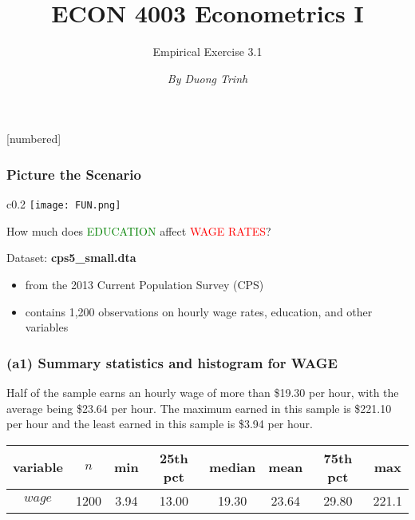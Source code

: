 \documentclass[11pt, xcolor=x11names,compress]{beamer}
\title [ECON 4003: Empirical Exercise 3.1]{ECON 4003 Econometrics I}
\author[]{Empirical Exercise 3.1}
\date[]{\textit{By Duong Trinh}}
\begin{document}
[numbered]
{
\frame{\titlepage}}


\begin{frame}[fragile,t]
\linespread{1.3}
\frametitle{Picture the Scenario}
        \begin{wrapfigure}{c}{0.2\textwidth}
            \texttt{[image: FUN.png]}
        \end{wrapfigure}
        How much does \textcolor{green}{EDUCATION} affect \textcolor{red}{WAGE RATES}?\\
\vspace{20mm}

Dataset: \textbf{cps5\_small.dta} 
\begin{itemize}
    \item from the 2013 Current Population Survey (CPS) %
    \item contains 1,200 observations on hourly wage rates, education, and other variables
\end{itemize}
\end{frame}

\begin{frame}[fragile,t]
\frametitle{(a1) Summary statistics and histogram for WAGE} \label{(a1)}
Half of the sample earns an hourly wage of more than \$19.30 per hour, with the average being \$23.64 per hour. The maximum earned in this sample is \$221.10 per hour and the least earned in this sample is \$3.94 per hour. 
\vspace{3mm}

\begin{center}
\setlength{\tabcolsep}{6pt}
\begin{tabular}{|c|c|c|c|c|c|c|c|}
\hline
variable &	$n$ & min & 25th pct & median & mean  & 75th pct &max \\
\hline
$wage$ & 1200 & 3.94 & 13.00 & 19.30 & 23.64 & 29.80 & 221.1	\\
\hline
\end{tabular}
\end{center}
\hyperlink{Percentiles}{}
\end{frame}
\end{document}
